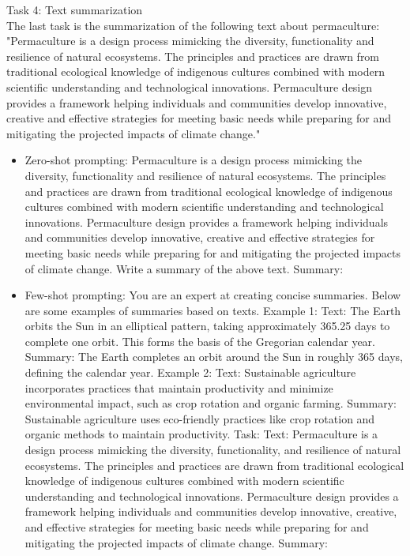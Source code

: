 Task 4: Text summarization\\
The last task is the summarization of the following text about permaculture: "Permaculture is a design process mimicking the diversity, functionality and resilience of natural ecosystems. The principles and practices are drawn from traditional ecological knowledge of indigenous cultures combined with modern scientific understanding and technological innovations. Permaculture design provides a framework helping individuals and communities develop innovative, creative and effective strategies for meeting basic needs while preparing for and mitigating the projected impacts of climate change."\cite{permaculture}
\begin{itemize}
    \item Zero-shot prompting: Permaculture is a design process mimicking the diversity, functionality and resilience of natural ecosystems. The principles and practices are drawn from traditional ecological knowledge of indigenous cultures combined with modern scientific understanding and technological innovations. Permaculture design provides a framework helping individuals and communities develop innovative, creative and effective strategies for meeting basic needs while preparing for and mitigating the projected impacts of climate change. Write a summary of the above text. Summary:
    \item Few-shot prompting: You are an expert at creating concise summaries. Below are some examples of summaries based on texts.
    Example 1: Text: The Earth orbits the Sun in an elliptical pattern, taking approximately 365.25 days to complete one orbit. This forms the basis of the Gregorian calendar year. Summary: The Earth completes an orbit around the Sun in roughly 365 days, defining the calendar year.
    Example 2: Text: Sustainable agriculture incorporates practices that maintain productivity and minimize environmental impact, such as crop rotation and organic farming. Summary: Sustainable agriculture uses eco-friendly practices like crop rotation and organic methods to maintain productivity.
    Task: Text: Permaculture is a design process mimicking the diversity, functionality, and resilience of natural ecosystems. The principles and practices are drawn from traditional ecological knowledge of indigenous cultures combined with modern scientific understanding and technological innovations. Permaculture design provides a framework helping individuals and communities develop innovative, creative, and effective strategies for meeting basic needs while preparing for and mitigating the projected impacts of climate change. Summary:

\end{itemize}
